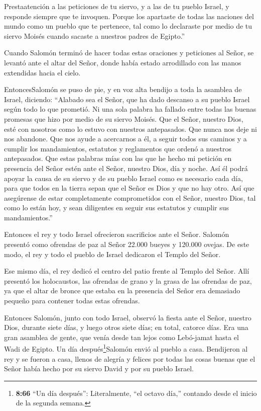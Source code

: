  Prestaatención a las peticiones de tu siervo, y a las de
tu pueblo Israel, y responde siempre que te invoquen. 
Porque los apartaste de todas las naciones del mundo como un pueblo que
te pertenece, tal como lo declaraste por medio de tu siervo Moisés
cuando sacaste a nuestros padres de Egipto.''

 Cuando Salomón terminó de hacer todas estas oraciones y
peticiones al Señor, se levantó ante el altar del Señor, donde había
estado arrodillado con las manos extendidas hacia el cielo.

 EntoncesSalomón se puso de pie, y en voz alta bendijo a
toda la asamblea de Israel, diciendo:  ``Alabado sea el
Señor, que ha dado descanso a su pueblo Israel según todo lo que
prometió. Ni una sola palabra ha fallado entre todas las buenas promesas
que hizo por medio de su siervo Moisés.  Que el Señor,
nuestro Dios, esté con nosotros como lo estuvo con nuestros antepasados.
Que nunca nos deje ni nos abandone.  Que nos ayude a
acercarnos a él, a seguir todos sus caminos y a cumplir los
mandamientos, estatutos y reglamentos que ordenó a nuestros antepasados.
 Que estas palabras mías con las que he hecho mi petición
en presencia del Señor estén ante el Señor, nuestro Dios, día y noche.
Así él podrá apoyar la causa de su siervo y de su pueblo Israel como es
necesario cada día,  para que todos en la tierra sepan que
el Señor es Dios y que no hay otro.  Así que asegúrense de
estar completamente comprometidos con el Señor, nuestro Dios, tal como
lo están hoy, y sean diligentes en seguir sus estatutos y cumplir sus
mandamientos.''

 Entonces el rey y todo Israel ofrecieron sacrificios ante
el Señor.  Salomón presentó como ofrendas de paz al Señor
22.000 bueyes y 120.000 ovejas. De este modo, el rey y todo el pueblo de
Israel dedicaron el Templo del Señor.

 Ese mismo día, el rey dedicó el centro del patio frente al
Templo del Señor. Allí presentó los holocaustos, las ofrendas de grano y
la grasa de las ofrendas de paz, ya que el altar de bronce que estaba en
la presencia del Señor era demasiado pequeño para contener todas estas
ofrendas.

 Entonces Salomón, junto con todo Israel, observó la fiesta
ante el Señor, nuestro Dios, durante siete días, y luego otros siete
días; en total, catorce días. Era una gran asamblea de gente, que venía
desde tan lejos como Lebó-jamat hasta el Wadi de Egipto. 
Un día después\footnote{\textbf{8:66} ``Un día después'': Literalmente,
  ``el octavo día,'' contando desde el inicio de la segunda semana.}Salomón
envió al pueblo a casa. Bendijeron al rey y se fueron a casa, llenos de
alegría y felices por todas las cosas buenas que el Señor había hecho
por su siervo David y por su pueblo Israel.

